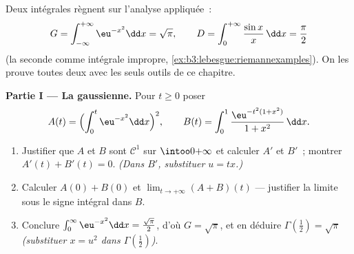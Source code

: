\begin{problem}
\label{pb:b3:lebesgue:1}
Deux intégrales règnent sur l'analyse appliquée~:
\[
G = \int_{-\infty}^{+\infty}\eu^{-x^2}\dd x = \sqrt\pi,
\qquad
D = \int_0^{+\infty}\frac{\sin x}{x}\,\dd x = \frac\pi2
\]
(la seconde comme intégrale impropre,
\cref{ex:b3:lebesgue:riemannexamples}). On les prouve toutes
deux avec les seuls outils de ce chapitre.

\medskip
\noindent\textbf{Partie I --- La gaussienne.} Pour $t \geq
0$ poser
\[
A(t) = \Bigl(\int_0^t\eu^{-x^2}\dd x\Bigr)^{2},
\qquad
B(t) = \int_0^1\frac{\eu^{-t^2(1 + x^2)}}{1 + x^2}\,\dd x .
\]
\begin{enumerate}
  \item Justifier que $A$ et $B$ sont $\mathcal C^1$ sur
        $\intoo0{+\infty}$ et calculer $A'$ et $B'$~;
        montrer $A'(t) + B'(t) = 0$. \emph{(Dans $B'$,
        substituer $u = tx$.)}
  \item Calculer $A(0) + B(0)$ et $\lim_{t\to+\infty}(A +
        B)(t)$ --- justifier la limite sous le signe
        intégral dans $B$.
  \item Conclure $\int_0^\infty \eu^{-x^2}\dd x =
        \frac{\sqrt\pi}2$, d'où $G = \sqrt\pi$, et en
        déduire $\Gamma(\tfrac12) = \sqrt\pi$
        \emph{(substituer $x = u^2$ dans
        $\Gamma(\frac12)$)}.
\end{enumerate}


\end{problem}
